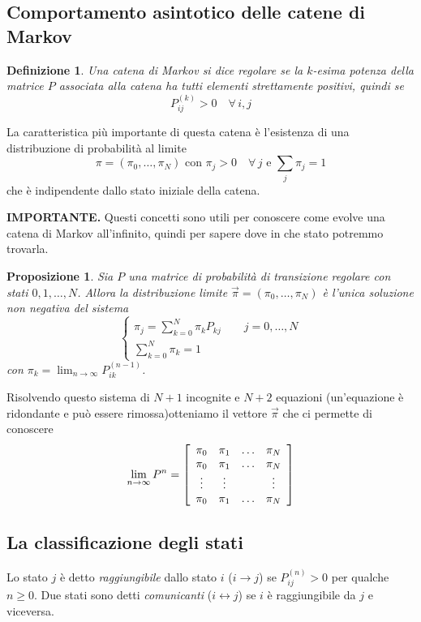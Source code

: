 \documentclass{article}
\newtheorem{definizione}{Definizione}[section]
\newtheorem{proposizione}{Proposizione}[section]
\begin{document}
\subsection{Comportamento asintotico delle catene di Markov}

\begin{definizione}
Una catena di Markov si dice \textit{regolare} se la $k$-esima potenza della matrice $P$ associata alla catena ha tutti elementi strettamente positivi, quindi se
$$
P_{ij}^{(k)} > 0\quad \forall\,i,j
$$
\end{definizione}
La caratteristica più importante di questa catena è l'esistenza di una distribuzione di probabilità al limite
$$
\pi = (\pi_0,\hdots,\pi_N) \text{ con } \pi_j > 0 \quad \forall\,j \text{ e } \sum_j \pi_j = 1
$$
che è indipendente dallo stato iniziale della catena.\\

\begin{boxedminipage}{\textwidth}
\textbf{IMPORTANTE.} Questi concetti sono utili per conoscere come evolve una catena di Markov all'infinito, quindi per sapere dove in che stato potremmo trovarla.
\begin{proposizione}
Sia $P$ una matrice di probabilità di transizione regolare con stati $0,1,\hdots,N$. Allora la distribuzione limite $\vec{\pi} = (\pi_0,\hdots,\pi_N)$ è l'unica soluzione non negativa del sistema
$$
\begin{cases}
\pi_j = \sum_{k=0}^N \pi_k P_{kj}\qquad j = 0,\hdots,N\\
\sum_{k=0}^N \pi_k = 1
\end{cases}
$$
con $\pi_k = \lim_{n \to \infty} P_{ik}^{(n-1)}$.
\end{proposizione}
Risolvendo questo sistema di $N+1$ incognite e $N+2$ equazioni (un'equazione è ridondante e può essere rimossa)otteniamo il vettore $\vec{\pi}$ che ci permette di conoscere
\begin{align*}
\lim_{n\to\infty} P^n = \left[\begin{array}{c c c c}
\pi_0 & \pi_1 & \hdots & \pi_N\\
\pi_0 & \pi_1 & \hdots & \pi_N\\
\vdots & \vdots & & \vdots\\
\pi_0 & \pi_1 & \hdots & \pi_N
\end{array}\right]
\end{align*} 
\end{boxedminipage}

\subsection{La classificazione degli stati}
Lo stato $j$ è detto \textit{raggiungibile} dallo stato $i$ ($i \to j$) se $P_{ij}^{(n)} > 0$ per qualche $n \ge 0$. Due stati sono detti \textit{comunicanti} ($i \leftrightarrow j$) se $i$ è raggiungibile da $j$ e viceversa.
\end{document}
